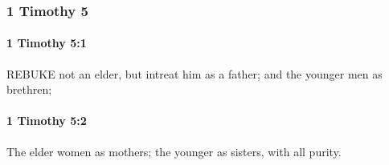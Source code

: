 	\subsubsection{1 Timothy 5} %
		\label{1TIMOTHY-5}
		
		\paragraph{1 Timothy 5:1} %
			\label{1TIMOTHY-5-1}

			REBUKE not an elder, but intreat him as a father; and the younger men as brethren;

			\begin{framed}
			\scriptsize
				\begin{compactdesc}
					\item[SBLG] 
				\end{compactdesc}
			\end{framed}

		\paragraph{1 Timothy 5:2} %
			\label{1TIMOTHY-5-2}

			The elder women as mothers; the younger as sisters, with all purity.


